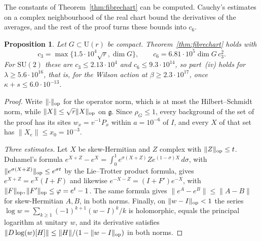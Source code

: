 \documentclass[11pt]{amsart}
\newtheorem{proposition}[theorem]{Proposition}
\theoremstyle{definition}
\theoremstyle{remark}
\numberwithin{equation}{section}
\newcommand{\SU}{\mathrm{SU}}
\newcommand{\U}{\mathrm{U}}
\newcommand{\g}{\mathfrak{g}}
\begin{document}
The constants of Theorem~\ref{thm:fibrechart} can be computed. Cauchy's
estimates on a complex neighbourhood of the real chart bound the
derivatives of the averages, and the rest of the proof turns these bounds
into $c_6$.

\begin{proposition}\label{prop:explicitconstants}
Let $G\subset\U(r)$ be compact. Theorem~\ref{thm:fibrechart} holds with
\[
c_3=\max\{1.5\cdot10^4\sqrt r,\dim G\},\qquad c_6=6.81\cdot10^5\dim G\,
c_3^2.
\]
For $\SU(2)$ these are $c_3\le2.13\cdot10^4$ and $c_6\le9.3\cdot10^{14}$, so
part~\textup{(iv)} holds for $\lambda\ge5.6\cdot10^{16}$, that is, for the
Wilson action at $\beta\ge2.3\cdot10^{17}$, once $\kappa+s\le6.0\cdot
10^{-13}$.
\end{proposition}

\begin{proof}
Write $\lVert\cdot\rVert_{\rm op}$ for the operator norm, which is at most
the Hilbert--Schmidt norm, while $\lVert X\rVert\le\sqrt r\lVert X\rVert
_{\rm op}$ on $\g$. Since $\rho_G\le1$, every background of the set of the
proof has its sites $w_x=v^{-1}P_x$ within $a=10^{-6}$ of $I$, and every $X$
of that set has $\lVert X_e\rVert\le x_0=10^{-3}$.

\emph{Three estimates.} Let $X$ be skew-Hermitian and $Z$ complex with
$\lVert Z\rVert_{\rm op}\le t$. Duhamel's formula $e^{X+Z}-e^X=\int_0^1e^{
\sigma(X+Z)}Ze^{(1-\sigma)X}\,d\sigma$, with $\lVert e^{\sigma(X+Z)}\rVert
_{\rm op}\le e^{\sigma t}$ by the Lie--Trotter product formula, gives
$e^{X+Z}=e^X(I+F)$ and likewise $e^{-X-Z}=(I+F')e^{-X}$, with $\lVert F
\rVert_{\rm op},\lVert F'\rVert_{\rm op}\le\varphi=e^t-1$. The same formula
gives $\lVert e^A-e^B\rVert\le\lVert A-B\rVert$ for skew-Hermitian $A,B$, in
both norms. Finally, on $\lVert w-I\rVert_{\rm op}<1$ the series $\log w=
\sum_{k\ge1}(-1)^{k+1}(w-I)^k/k$ is holomorphic, equals the principal
logarithm at unitary $w$, and its derivative satisfies $\lVert D\log(w)[H]
\rVert\le\lVert H\rVert/(1-\lVert w-I\rVert_{\rm op})$ in both norms.


\end{proof}
\end{document}
